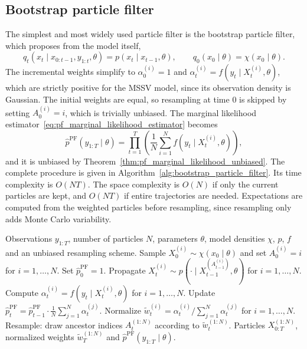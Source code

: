 \subsection{Bootstrap particle filter}
\label{sec:bootstrap_particle_filter}
The simplest and most widely used particle filter is the bootstrap particle filter, which proposes from the model itself,
\begin{equation}
    q_t(x_t\mid x_{0:t-1},y_{1:t},\theta) = p(x_t\mid x_{t-1},\theta), \qquad q_0(x_0\mid\theta) = \chi(x_0\mid\theta).
\end{equation}
The incremental weights simplify to $\alpha_0^{(i)} = 1$ and $\alpha_t^{(i)} = f(y_t\mid X_t^{(i)},\theta)$, which are strictly positive for the MSSV model, since its observation density is Gaussian. The initial weights are equal, so resampling at time $0$ is skipped by setting $A_0^{(i)} = i$, which is trivially unbiased. The marginal likelihood estimator~\eqref{eq:pf_marginal_likelihood_estimator} becomes
\begin{equation}
    \hat{p}^{\mathrm{PF}}(y_{1:T}\mid\theta) = \prod_{t=1}^{T}\left(\frac{1}{N}\sum_{i=1}^{N} f(y_t\mid X_t^{(i)},\theta)\right),
    \label{eq:bootstrap_marginal_likelihood_estimator}
\end{equation}
and it is unbiased by Theorem~\ref{thm:pf_marginal_likelihood_unbiased}. The complete procedure is given in Algorithm~\ref{alg:bootstrap_particle_filter}. Its time complexity is $O(NT)$. The space complexity is $O(N)$ if only the current particles are kept, and $O(NT)$ if entire trajectories are needed. Expectations are computed from the weighted particles before resampling, since resampling only adds Monte Carlo variability.

\begin{algorithm}
\caption{Bootstrap particle filter}
\label{alg:bootstrap_particle_filter}
\begin{algorithmic}[1]
    \REQUIRE Observations $y_{1:T}$, number of particles $N$, parameters $\theta$, model densities $\chi$, $p$, $f$ and an unbiased resampling scheme.
    \STATE Sample $X_0^{(i)} \sim \chi(x_0 \mid \theta)$ and set $A_0^{(i)} = i$ for $i=1,\ldots,N$.
    \STATE Set $\hat{p}^{\mathrm{PF}}_0 = 1$.
        \STATE Propagate $X_t^{(i)} \sim p(\cdot \mid X_{t-1}^{(A_{t-1}^{(i)})}, \theta)$ for $i=1,\ldots,N$.
        \STATE Compute $\alpha_t^{(i)} = f(y_t \mid X_t^{(i)}, \theta)$ for $i=1,\ldots,N$.
        \STATE Update $\hat{p}^{\mathrm{PF}}_t = \hat{p}^{\mathrm{PF}}_{t-1}\cdot\frac{1}{N}\sum_{j=1}^{N} \alpha_t^{(j)}$.
        \STATE Normalize $\tilde{w}_t^{(i)} = \alpha_t^{(i)} / \sum_{j=1}^{N} \alpha_t^{(j)}$ for $i=1,\ldots,N$.
        \STATE Resample: draw ancestor indices $A_t^{(1:N)}$ according to $\tilde{w}_t^{(1:N)}$.
    \ENDFOR
    \RETURN Particles $X_{0:T}^{(1:N)}$, normalized weights $\tilde{w}_T^{(1:N)}$ and $\hat{p}^{\mathrm{PF}}(y_{1:T}\mid\theta)$.
\end{algorithmic}
\end{algorithm}

